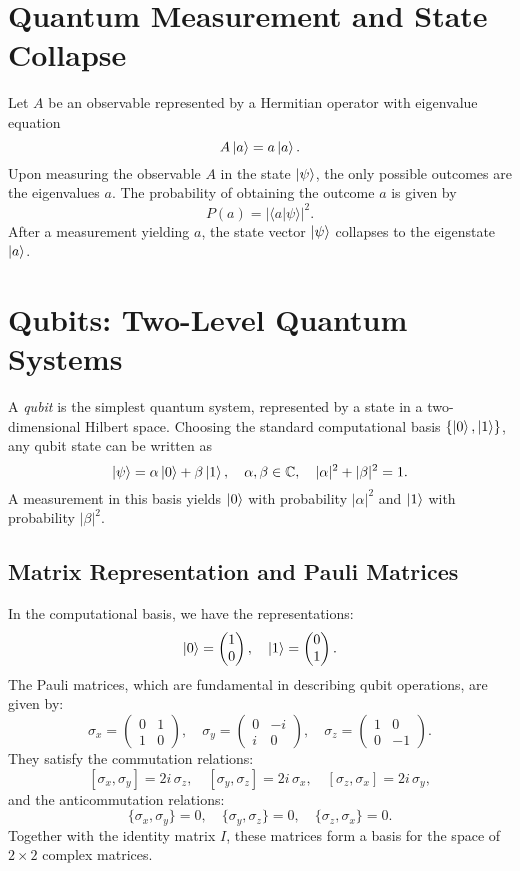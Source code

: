 \documentclass[12pt,oneside]{book}
\theoremstyle{remark}
\begin{document}
	\section{Quantum Measurement and State Collapse}
	
	Let \( A \) be an observable represented by a Hermitian operator with eigenvalue equation
	\[
	A \ket{a} = a \ket{a}.
	\]
	Upon measuring the observable \( A \) in the state \( \ket{\psi} \), the only possible outcomes are the eigenvalues \( a \). The probability of obtaining the outcome \( a \) is given by
	\[
	P(a) = |\langle a | \psi \rangle|^2.
	\]
	After a measurement yielding \( a \), the state vector \(\ket{\psi}\) collapses to the eigenstate \( \ket{a} \).
	
	\section{Qubits: Two-Level Quantum Systems}
	
	A \emph{qubit} is the simplest quantum system, represented by a state in a two-dimensional Hilbert space. Choosing the standard computational basis \( \{ \ket{0}, \ket{1} \} \), any qubit state can be written as
	\[
	\ket{\psi} = \alpha \ket{0} + \beta \ket{1}, \quad \alpha,\beta\in\mathbb{C}, \quad |\alpha|^2 + |\beta|^2 = 1.
	\]
	A measurement in this basis yields \( \ket{0} \) with probability \( |\alpha|^2 \) and \( \ket{1} \) with probability \( |\beta|^2 \).
	
	\subsection{Matrix Representation and Pauli Matrices}
	
	In the computational basis, we have the representations:
	\[
	\ket{0} = \begin{pmatrix} 1 \\ 0 \end{pmatrix}, \quad \ket{1} = \begin{pmatrix} 0 \\ 1 \end{pmatrix}.
	\]
	The Pauli matrices, which are fundamental in describing qubit operations, are given by:
	\[
	\sigma_x = \begin{pmatrix} 0 & 1 \\ 1 & 0 \end{pmatrix},\quad
	\sigma_y = \begin{pmatrix} 0 & -i \\ i & 0 \end{pmatrix},\quad
	\sigma_z = \begin{pmatrix} 1 & 0 \\ 0 & -1 \end{pmatrix}.
	\]
	They satisfy the commutation relations:
	\[
	[\sigma_x,\sigma_y] = 2i\,\sigma_z, \quad
	[\sigma_y,\sigma_z] = 2i\,\sigma_x, \quad
	[\sigma_z,\sigma_x] = 2i\,\sigma_y,
	\]
	and the anticommutation relations:
	\[
	\{\sigma_x,\sigma_y\} = 0, \quad
	\{\sigma_y,\sigma_z\} = 0, \quad
	\{\sigma_z,\sigma_x\} = 0.
	\]
	Together with the identity matrix \( I \), these matrices form a basis for the space of \( 2\times 2 \) complex matrices.
	
\end{document}
